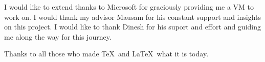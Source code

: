 I would like to extend thanks to Microsoft for graciously providing me a VM to work on.
I would thank my advisor Mausam for his constant support and insights on this project. 
I would like to thank Dinesh for his suport and effort and guiding me along the way for this journey.

Thanks to all those who made \TeX\ and \LaTeX\ what it is today.